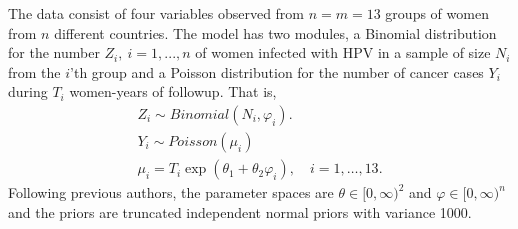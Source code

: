 The data consist of four variables observed from $n=m=13$ groups of women from $n$ different countries.
The model has two modules, a Binomial distribution for the number $Z_i,\ i=1,...,n$ of women infected with HPV in a sample of size $N_i$ from the $i$'th group and a Poisson distribution for the number of cancer cases $Y_i$ during $T_i$ women-years of followup. That is,
\begin{gather*}
  Z_i \sim Binomial(N_i, \varphi_i ). \nonumber \\
  Y_i \sim Poisson( \mu_i ) \\
  \mu_i=T_i \exp( \theta_1+\theta_2 \varphi_i ),\quad i=1,\ldots,13.\nonumber
\end{gather*}
Following previous authors, the parameter spaces are $\theta\in [0,\infty)^2$ and $\varphi\in [0,\infty)^n$ and the priors are truncated independent normal priors with variance 1000.



